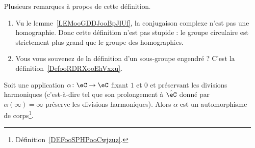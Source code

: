 Plusieurs remarques à propos de cette définition.
\begin{enumerate}
	\item
	      Vu le lemme~\ref{LEMooGDDJooBpJlUf}, la conjugaison complexe n'est pas une homographie. Donc cette définition n'est pas stupide : le groupe circulaire est strictement plus grand que le groupe des homographies.
	\item
	      Vous vous souvenez de la définition d'un sous-groupe engendré ? C'est la définition~\ref{DefooRDRXooEhVxxu}.
\end{enumerate}

\begin{lemma}       \label{LEMooOPOMooWZLSeH}
	Soit une application \( \alpha\colon \eC\to \eC\) fixant \( 1\) et \( 0\) et préservant les divisions harmoniques (c'est-à-dire tel que son prolongement à \( \hat\eC\) donné par \( \alpha(\infty)=\infty\) préserve les divisions harmoniques). Alors \( \alpha\) est un automorphisme de corps\footnote{Définition~\ref{DEFooSPHPooCwjzuz}.}.
\end{lemma}

